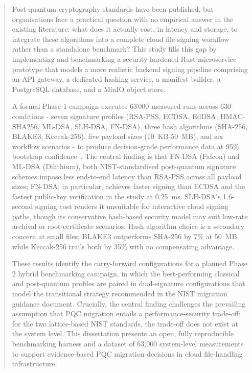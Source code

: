 \documentclass[12pt,a4paper]{article}
\begin{document}

% 
% 
% 

\begin{abstract}
Post-quantum cryptography standards have been published, but organisations face a practical question with no empirical answer in the existing literature: what does it actually cost, in latency and storage, to integrate these algorithms into a complete cloud file-signing workflow rather than a standalone benchmark? This study fills this gap by implementing and benchmarking a security-hardened Rust microservice prototype that models a more realistic backend signing pipeline comprising an API gateway, a dedicated hashing service, a manifest builder, a PostgreSQL database, and a MinIO object store.

A formal Phase 1 campaign executes 63\,000 measured runs across 630 conditions - seven signature profiles (RSA-PSS, ECDSA, EdDSA, HMAC-SHA256, ML-DSA,
SLH-DSA, FN-DSA), three hash algorithms (SHA-256, BLAKE3, Keccak-256), five payload sizes (10~KB-50~MB), and six workflow scenarios - to produce
decision-grade performance data at 95\% bootstrap confidence~\cite{efron1979bootstrap}. The central finding is that FN-DSA (Falcon) and ML-DSA (Dilithium), both NIST-standardised
post-quantum signature schemes impose less end-to-end latency than RSA-PSS across all payload sizes; FN-DSA, in particular, achieves faster signing than ECDSA and the fastest public-key verification in the study at 0.25~ms. SLH-DSA's 1.6-second signing cost renders it unsuitable for interactive cloud signing paths, though its conservative hash-based security model may suit low-rate archival or root-certificate scenarios. Hash algorithm choice is a secondary concern at small files; BLAKE3 outperforms SHA-256 by 7\% at 50~MB, while Keccak-256 trails both by 35\% with no compensating advantage.

These results identify the carry-forward configurations for a planned Phase 2 hybrid benchmarking campaign, in which the best-performing classical and post-quantum profiles are paired in dual-signature configurations that model the transitional strategy recommended in the NIST migration guidance document. Crucially, the central finding challenges the prevailing assumption that PQC migration entails a performance-security trade-off: for the two lattice-based NIST standards, the trade-off does not exist at the system level. This dissertation presents an open, fully reproducible benchmarking harness and a dataset of 63,000 system-level measurements to support evidence-based PQC migration decisions in cloud file-handling infrastructure.
\end{abstract}
\clearpage
\end{document}
